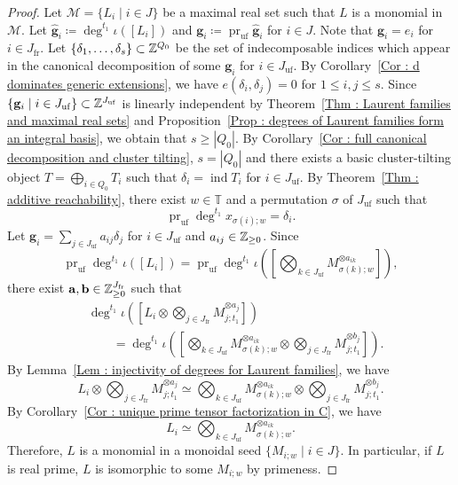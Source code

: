 \begin{proof}
Let $\mathcal{M} = \{L_i \mid i \in J\}$ be a maximal real set
such that $L$ is a monomial in $\mathcal{M}$.
Let $\widehat{\mathbf{g}}_i \coloneq \deg^{t_1}\iota([L_i])$
and $\mathbf{g}_i
\coloneq \operatorname{pr}_{\mathrm{uf}}\widehat{\mathbf{g}}_i$
for $i \in J$.
Note that $\widehat{\mathbf{g}}_i = e_i$ for $i \in J_{\mathrm{fr}}$.
Let $\{\delta_1, \ldots, \delta_s\} \subset \mathbb{Z}^{Q_0}$
be the set of indecomposable indices which appear in
the canonical decomposition of some $\mathbf{g}_i$
for $i \in J_{\mathrm{uf}}$.
By Corollary~\ref{Cor : d dominates generic extensions}, we have
$e(\delta_i, \delta_j) = 0$ for $1 \leq i, j \leq s$.
Since
$\{\mathbf{g}_i \mid i \in J_{\mathrm{uf}}\}
\subset \mathbb{Z}^{J_{\mathrm{uf}}}$
is linearly independent by
Theorem~\ref{Thm : Laurent families and maximal real sets} and
Proposition~\ref{Prop : degrees of Laurent families form an integral basis},
we obtain that $s \geq |Q_0|$.
By Corollary~\ref{Cor : full canonical decomposition and cluster tilting},
$s = |Q_0|$ and there exists a basic cluster-tilting object
$T = \bigoplus_{i \in Q_0}T_i$ such that
$\delta_i = \operatorname{ind}T_i$ for $i \in J_{\mathrm{uf}}$.
By Theorem~\ref{Thm : additive reachability},
there exist $w \in \mathbb{T}$ and a permutation $\sigma$
of $J_{\mathrm{uf}}$ such that
\[
\operatorname{pr}_{\mathrm{uf}}\deg^{t_1}x_{\sigma(i);w}
= \delta_i.
\]
Let $\mathbf{g}_i = \sum_{j \in J_{\mathrm{uf}}}a_{ij}\delta_j$
for $i \in J_{\mathrm{uf}}$ and $a_{ij} \in \mathbb{Z}_{\geq 0}$.
Since
\[
\operatorname{pr}_{\mathrm{uf}}\deg^{t_1}\iota([L_i])
= \operatorname{pr}_{\mathrm{uf}}\deg^{t_1}
\iota\left(\left[
\bigotimes_{k \in J_{\mathrm{uf}}}
M_{\sigma(k);w}^{\otimes a_{ik}}
\right]\right),
\]
there exist $\mathbf{a}, \mathbf{b}
\in \mathbb{Z}_{\geq 0}^{J_{\mathrm{fr}}}$ such that
\[
\begin{aligned}
&\deg^{t_1}\iota\left(\left[
L_i \otimes \bigotimes_{j \in J_{\mathrm{fr}}}
M_{j;t_1}^{\otimes a_j}\right]\right) \\
&\qquad = \deg^{t_1}\iota\left(\left[
\bigotimes_{k \in J_{\mathrm{uf}}}
M_{\sigma(k);w}^{\otimes a_{ik}}
\otimes \bigotimes_{j \in J_{\mathrm{fr}}}
M_{j;t_1}^{\otimes b_j}\right]\right).
\end{aligned}
\]
By Lemma~\ref{Lem : injectivity of degrees for Laurent families},
we have
\[
L_i \otimes \bigotimes_{j \in J_{\mathrm{fr}}}
M_{j;t_1}^{\otimes a_j}
\simeq \bigotimes_{k \in J_{\mathrm{uf}}}
M_{\sigma(k);w}^{\otimes a_{ik}}
\otimes \bigotimes_{j \in J_{\mathrm{fr}}}
M_{j;t_1}^{\otimes b_j}.
\]
By Corollary~\ref{Cor : unique prime tensor factorization in C},
we have
\[
L_i \simeq \bigotimes_{k \in J_{\mathrm{uf}}}
M_{\sigma(k);w}^{\otimes a_{ik}}.
\]
Therefore, $L$ is a monomial in a monoidal seed
$\{M_{i;w} \mid i \in J\}$.
In particular, if $L$ is real prime,
$L$ is isomorphic to some $M_{i;w}$ by primeness.
\end{proof}
